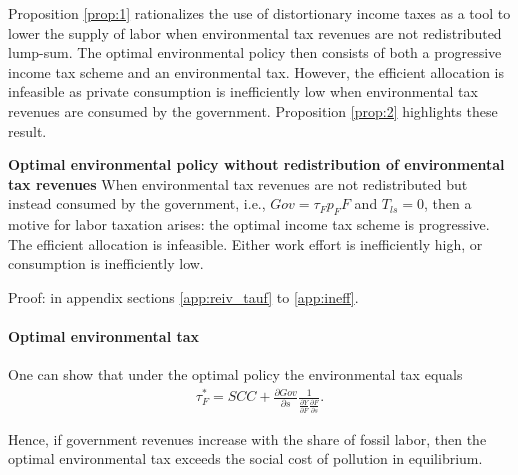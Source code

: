 
Proposition \ref{prop:1} rationalizes the use of distortionary income taxes as a tool to lower the supply of labor when environmental tax revenues are not redistributed lump-sum. 
The optimal environmental policy then consists of both a progressive income tax scheme and an environmental tax. However, the efficient allocation is infeasible as private consumption is inefficiently low when environmental tax revenues are consumed by the government. Proposition \ref{prop:2} highlights these result.

\begin{prop}\label{prop:2}\textbf{Optimal environmental policy without redistribution of environmental tax revenues}
When environmental tax revenues are not redistributed but instead consumed by the government, i.e., $Gov=\tau_Fp_FF$ and $T_{ls}= 0$, then  a motive for labor taxation arises: the optimal income tax scheme is progressive. %
The efficient allocation is infeasible.  Either work effort is inefficiently high, or consumption is inefficiently low. 
\end{prop}

Proof: in appendix sections \ref{app:reiv_tauf} to \ref{app:ineff}.

\paragraph{Optimal environmental tax}
One can show that under the optimal policy the environmental tax equals
	\begin{align}
\tau_{F}^*= SCC+\frac{\partial Gov}{\partial s}\frac{1}{\frac{\partial Y}{\partial F}\frac{\partial F}{\partial s}}.
\end{align}
\begin{comment}
content...

This can be further simplified:
\begin{align}
\tau_F^* = 1-\frac{SCC}{\frp{w}{s}}w. 
\end{align}
A condition for $\tau_F$ to exceed the social cost of the externality reads
\begin{align}
SCC<\frac{1}{1+\frac{w}{\frp{w}{s}}}
\end{align}
\end{comment}
Hence, if government revenues increase with the share of fossil labor, then the optimal environmental tax exceeds the social cost of pollution in equilibrium. 	

